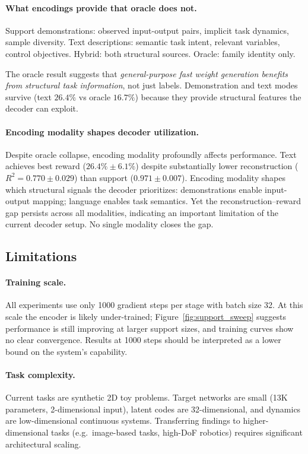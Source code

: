 \paragraph{What encodings provide that oracle does not.}
Support demonstrations: observed input-output pairs, implicit task dynamics, sample diversity.
Text descriptions: semantic task intent, relevant variables, control objectives.
Hybrid: both structural sources.
Oracle: family identity only.

The oracle result suggests that \emph{general-purpose fast weight generation benefits from structural task information}, not just labels.
Demonstration and text modes survive (text $26.4\%$ vs oracle $16.7\%$) because they provide structural features the decoder can exploit.

\paragraph{Encoding modality shapes decoder utilization.}
Despite oracle collapse, encoding modality profoundly affects performance.
Text achieves best reward ($26.4\%\pm6.1\%$) despite substantially lower reconstruction ($R^2 = 0.770 \pm 0.029$) than support ($0.971 \pm 0.007$).
Encoding modality shapes which structural signals the decoder prioritizes: demonstrations enable input-output mapping; language enables task semantics.
Yet the reconstruction--reward gap persists across all modalities, indicating an important limitation of the current decoder setup.
No single modality closes the gap.

\subsection{Limitations}

\paragraph{Training scale.}
All experiments use only 1000 gradient steps per stage with batch size 32.
At this scale the encoder is likely under-trained; Figure~\ref{fig:support_sweep} suggests performance is still improving at larger support sizes, and training curves show no clear convergence.
Results at 1000 steps should be interpreted as a lower bound on the system's capability.

\paragraph{Task complexity.}
Current tasks are synthetic 2D toy problems.
Target networks are small (13K parameters, 2-dimensional input), latent codes are 32-dimensional, and dynamics are low-dimensional continuous systems.
Transferring findings to higher-dimensional tasks (e.g.\ image-based tasks, high-DoF robotics) requires significant architectural scaling.

